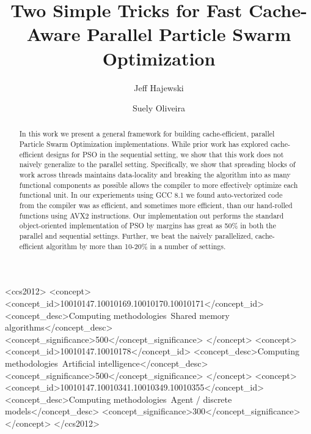 \documentclass[sigconf]{acmart}
\begin{document}
\title[Two Simple Tricks for Fast Cache-Aware Parallel PSO]{Two Simple Tricks for Fast Cache-Aware Parallel Particle Swarm Optimization}
\author{Jeff Hajewski}

\author{Suely Oliveira}

\renewcommand{\shortauthors}{J. Hajewski et al.}


\begin{abstract}
  In this work we present a general framework for building cache-efficient,
  parallel Particle Swarm Optimization implementations.  While prior work
  \cite{cache-pso} has explored cache-efficient designs for PSO in the
  sequential setting, we show that this work does not naively generalize to the
  parallel setting.  Specifically, we show that spreading blocks of work across
  threads maintains data-locality and breaking the algorithm into as many
  functional components as possible allows the compiler to more effectively
  optimize each functional unit.  In our experiements using GCC 8.1
  we found auto-vectorized code from the compiler was as efficient, and
  sometimes more efficient, than our hand-rolled functions using AVX2
  instructions.  Our implementation out performs the standard object-oriented
  implementation of PSO by margins has great as 50\% in both the parallel and
  sequential settings. Further, we beat the naively parallelized,
  cache-efficient algorithm by more than 10-20\% in a number of settings.
\end{abstract}

%
%
\begin{CCSXML}
<ccs2012>
<concept>
<concept_id>10010147.10010169.10010170.10010171</concept_id>
<concept_desc>Computing methodologies~Shared memory algorithms</concept_desc>
<concept_significance>500</concept_significance>
</concept>
<concept>
<concept_id>10010147.10010178</concept_id>
<concept_desc>Computing methodologies~Artificial intelligence</concept_desc>
<concept_significance>500</concept_significance>
</concept>
<concept>
<concept_id>10010147.10010341.10010349.10010355</concept_id>
<concept_desc>Computing methodologies~Agent / discrete models</concept_desc>
<concept_significance>300</concept_significance>
</concept>
</ccs2012>
\end{CCSXML}
\end{document}

